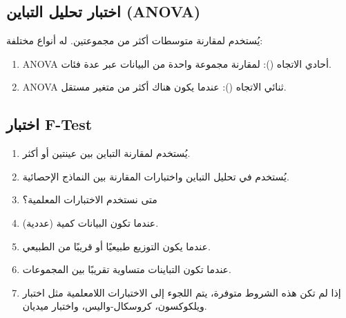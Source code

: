\subsection{اختبار تحليل التباين (ANOVA)}
يُستخدم لمقارنة متوسطات أكثر من مجموعتين.
له أنواع مختلفة: 
\begin{enumerate}
\item  	ANOVA أحادي الاتجاه (): لمقارنة مجموعة واحدة من البيانات عبر عدة فئات.
\item  	ANOVA ثنائي الاتجاه (): عندما يكون هناك أكثر من متغير مستقل.
\end{enumerate}

\subsection{اختبار F-Test}
\begin{enumerate}[label=$\bullet$]
\item  	يُستخدم لمقارنة التباين بين عينتين أو أكثر.
\item  	يُستخدم في تحليل التباين واختبارات المقارنة بين النماذج الإحصائية.
\item 	متى نستخدم الاختبارات المعلمية؟
\item  	عندما تكون البيانات كمية (عددية).
\item  	عندما يكون التوزيع طبيعيًا أو قريبًا من الطبيعي.
\item 	عندما تكون التباينات متساوية تقريبًا بين المجموعات.
\item  	إذا لم تكن هذه الشروط متوفرة، يتم اللجوء إلى الاختبارات اللامعلمية مثل اختبار ويلكوكسون، كروسكال-واليس، واختبار ميديان.
\end{enumerate}

